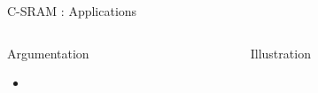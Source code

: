 \begin{Frame}{C-SRAM : Applications}
 \begin{columns}[t]
   \begin{column}{\BW}
      \begin{block}{Argumentation}
          \begin{itemize}
        \item
      \end{itemize}

    \end{block}

  \end{column}
  \begin{column}{\BW}
      \begin{block}{Illustration}
    \end{block}

  \end{column}

 \end{columns}

\end{Frame}

